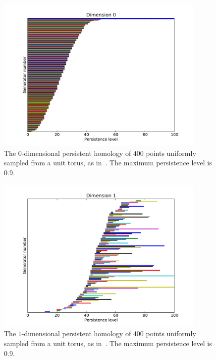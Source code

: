 \documentclass[a4paper,10pt]{article}
\begin{document}
\begin{figure}[htpb]
  \centering
  \includegraphics[width=0.9\textwidth]{torus_d0}
  \caption{The $0$-dimensional persistent homology of $400$ points uniformly sampled from a unit torus, as in~\citep{javaplextut}. The maximum persistence level is $0.9$.} \label{fig:torus0}
\end{figure}
\begin{figure}[htpb]
  \centering
  \includegraphics[width=0.9\textwidth]{torus_d1}
  \caption{The $1$-dimensional persistent homology of $400$ points uniformly sampled from a unit torus, as in~\citep{javaplextut}. The maximum persistence level is $0.9$.} \label{fig:torus1}
\end{figure}
\end{document}
